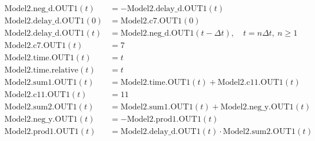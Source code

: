 \documentclass{article}
\begin{document}
\[
\begin{aligned}
\mathrm{Model2.neg\_d.OUT1}(t) &= -\mathrm{Model2.delay\_d.OUT1}(t) \\[4pt]
\mathrm{Model2.delay\_d.OUT1}(0) &= \mathrm{Model2.c7.OUT1}(0) \\[4pt]
\mathrm{Model2.delay\_d.OUT1}(t) &= \mathrm{Model2.neg\_d.OUT1}(t-\Delta t), \quad t=n\Delta t,\ n\geq1 \\[4pt]
\mathrm{Model2.c7.OUT1}(t) &= 7 \\[4pt]
\mathrm{Model2.time.OUT1}(t) &= t \\[4pt]
\mathrm{Model2.time.relative}(t) &= t \\[4pt]
\mathrm{Model2.sum1.OUT1}(t) &= \mathrm{Model2.time.OUT1}(t) + \mathrm{Model2.c11.OUT1}(t) \\[4pt]
\mathrm{Model2.c11.OUT1}(t) &= 11 \\[4pt]
\mathrm{Model2.sum2.OUT1}(t) &= \mathrm{Model2.sum1.OUT1}(t) + \mathrm{Model2.neg\_y.OUT1}(t) \\[4pt]
\mathrm{Model2.neg\_y.OUT1}(t) &= -\mathrm{Model2.prod1.OUT1}(t) \\[4pt]
\mathrm{Model2.prod1.OUT1}(t) &= \mathrm{Model2.delay\_d.OUT1}(t) \cdot \mathrm{Model2.sum2.OUT1}(t)
\end{aligned}
\]
\end{document}
